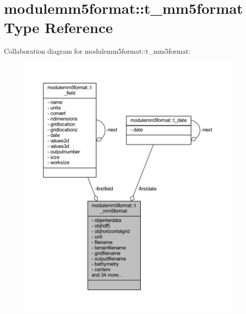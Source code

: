 \hypertarget{structmodulemm5format_1_1t__mm5format}{}\section{modulemm5format\+:\+:t\+\_\+mm5format Type Reference}
\label{structmodulemm5format_1_1t__mm5format}


Collaboration diagram for modulemm5format\+:\+:t\+\_\+mm5format\+:\nopagebreak
\begin{figure}[H]
\begin{center}
\leavevmode
\includegraphics[width=350pt]{structmodulemm5format_1_1t__mm5format__coll__graph}
\end{center}
\end{figure}
